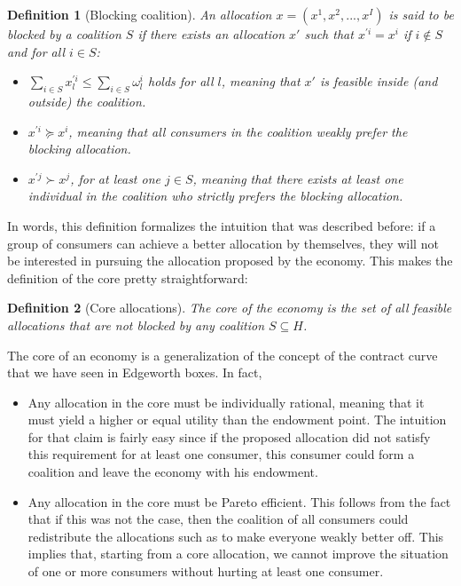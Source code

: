 \documentclass[12pt]{report}
\newtheorem{definition}{Definition}[chapter]
\begin{document}
\begin{definition}[Blocking coalition]
An allocation $x = (x^1, x^2, ..., x^I)$ is said to be blocked by a coalition $S$ if there exists an allocation $x'$ such that $x^{'i} = x^i$ if $i\not\in S$ and for all $i\in S$:\begin{itemize}
\item $\sum_{i\in S} x_l^{'i} \leq \sum_{i\in S} \omega_l^{i}$ holds for all $l$, meaning that $x'$ is feasible inside (and outside) the coalition.
\item $x^{'i}\succeq x^i$, meaning that all consumers in the coalition weakly prefer the blocking allocation.
\item $x^{'j}\succ x^j$, for at least one $j\in S$, meaning that there exists at least one individual in the coalition who strictly prefers the blocking allocation.
\end{itemize}  
\end{definition}

In words, this definition formalizes the intuition that was described before: if a group of consumers can achieve a better allocation by themselves, they will not be interested in pursuing the allocation proposed by the economy. This makes the definition of the core pretty straightforward:

\begin{definition}[Core allocations]
The core of the economy is the set of all feasible allocations that are not blocked by any coalition $S\subseteq H$.
\end{definition}

The core of an economy is a generalization of the concept of the contract curve that we have seen in Edgeworth boxes. In fact,\begin{itemize}
\item Any allocation in the core must be individually rational, meaning that it must yield a higher or equal utility than the endowment point. The intuition for that claim is fairly easy since if the proposed allocation did not satisfy this requirement for at least one consumer, this consumer could form a coalition and leave the economy with his endowment.
\item Any allocation in the core must be Pareto efficient. This follows from the fact that if this was not the case, then the coalition of all consumers could redistribute the allocations such as to make everyone weakly better off. This implies that, starting from a core allocation, we cannot improve the situation of one or more consumers without hurting at least one consumer.
\end{itemize}
\end{document}
